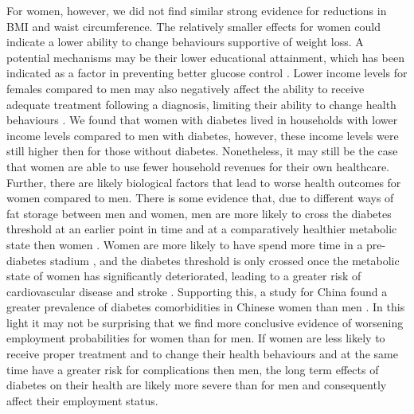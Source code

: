 For women, however, we did not find similar strong evidence for reductions in \ac{BMI} and waist circumference. The relatively smaller effects for women could indicate a lower ability to change behaviours supportive of weight loss. A potential mechanisms may be their lower educational attainment, which has been indicated as a factor in preventing better glucose control \autocite{Luo2015}. Lower income levels for females compared to men may also negatively affect the ability to receive adequate treatment following a diagnosis, limiting their ability to change health behaviours \autocite{Luo2015}. We found that women with diabetes lived in households with lower income levels compared to men with diabetes, however, these income levels were still higher then for those without diabetes. Nonetheless, it may still be the case that women are able to use fewer household revenues for their own healthcare. Further, there are likely biological factors that lead to worse health outcomes for women compared to men. There is some evidence that, due to different ways of fat storage between men and women, men are more likely to cross the diabetes threshold at an earlier point in time and at a comparatively healthier metabolic state then women \parencite{Peters2015,Peters2014a,Peters2014}. Women are more likely to have spend more time in a pre-diabetes stadium \parencite{Bertram2010}, and the diabetes threshold is only crossed once the metabolic state of women has significantly deteriorated, leading to a greater risk of cardiovascular disease and stroke \parencite{Peters2015}. Supporting this, a study for China found a greater prevalence of diabetes comorbidities in Chinese women than men \autocite{Liu2010}. In this light it may not be surprising that we find more conclusive evidence of worsening employment probabilities for women than for men. If women are less likely to receive proper treatment and to change their health behaviours and at the same time have a greater risk for complications then men, the long term effects of diabetes on their health are likely more severe than for men and consequently affect their employment status.

